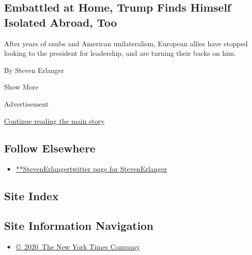 \begin{enumerate}
  \hypertarget{embattled-at-home-trump-finds-himself-isolated-abroad-too}{%
  \subsection{Embattled at Home, Trump Finds Himself Isolated Abroad,
  Too}\label{embattled-at-home-trump-finds-himself-isolated-abroad-too}}

  After years of snubs and American unilateralism, European allies have
  stopped looking to the president for leadership, and are turning their
  backs on him.

  By Steven Erlanger
\end{enumerate}

Show More

Advertisement

\protect\hyperlink{after-mid2}{Continue reading the main story}

\hypertarget{follow-elsewhere}{%
\subsection{Follow Elsewhere}\label{follow-elsewhere}}

\begin{itemize}
\tightlist
\item
  \href{https://twitter.com/StevenErlanger}{**StevenErlangertwitter page
  for StevenErlanger}
\end{itemize}

\hypertarget{site-index}{%
\subsection{Site Index}\label{site-index}}

\hypertarget{site-information-navigation}{%
\subsection{Site Information
Navigation}\label{site-information-navigation}}

\begin{itemize}
\tightlist
\item
  \href{https://help.nytimes.com/hc/en-us/articles/115014792127-Copyright-notice}{©~2020~The
  New York Times Company}
\end{itemize}

